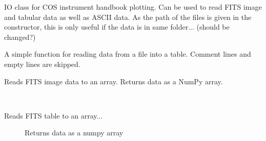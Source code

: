 \documentclass[letterpaper,10pt,english]{sphinxmanual}
\begin{document}
\begin{fulllineitems}
\label{SamPy.plot.COSIHB:SamPy.plot.COSIHB.IO.COSHBIO}
IO class for COS instrument handbook plotting.
Can be used to read FITS image and tabular data as well as ASCII data.
As the path of the files is given in the constructor, this is only useful
if the data is in same folder... (should be changed?)


\begin{fulllineitems}
\label{SamPy.plot.COSIHB:SamPy.plot.COSIHB.IO.COSHBIO.ASCIITable}
A simple function for reading data from a file into a table.
Comment lines and empty lines are skipped.

\end{fulllineitems}



\begin{fulllineitems}
\label{SamPy.plot.COSIHB:SamPy.plot.COSIHB.IO.COSHBIO.FITSImage}
Reads FITS image data to an array.
Returns data as a NumPy array.

\end{fulllineitems}



\begin{fulllineitems}
\label{SamPy.plot.COSIHB:SamPy.plot.COSIHB.IO.COSHBIO.FITSTable}~\begin{description}
\item[{Reads FITS table to an array...}] \leavevmode
Returns data as a numpy array

\end{description}

\end{fulllineitems}



\begin{fulllineitems}
\label{SamPy.plot.COSIHB:SamPy.plot.COSIHB.IO.COSHBIO.Header}
\end{fulllineitems}



\end{fulllineitems}
\end{document}
